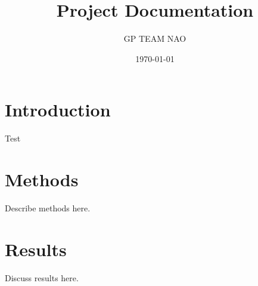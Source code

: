 \documentclass[a4paper,12pt]{article}
\title{Project Documentation}
\author{GP TEAM NAO}
\date{\today}
\begin{document}
\maketitle
\tableofcontents

\section{Introduction}
Test

\section{Methods}
Describe methods here.

\section{Results}
Discuss results here.
\end{document}
